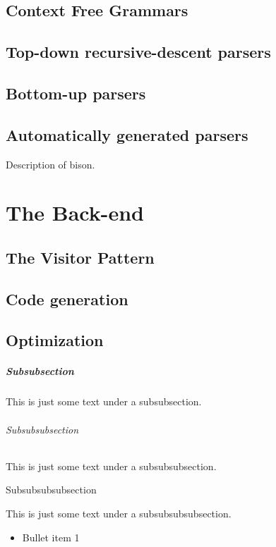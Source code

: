 \documentclass[letterpaper,12pt,openany,reqno]{book}%
\begin{document}
\begin{emumerate}
\chapter{Context Free Grammars}
\chapter {Top-down recursive-descent parsers}
\chapter {Bottom-up parsers}
\chapter {Automatically generated parsers}
Description of bison.

\part{The Back-end}
\chapter {The Visitor Pattern}
\chapter {Code generation}
\chapter {Optimization}

\subsubsection{Subsubsection}

This is just some text under a subsubsection.

\paragraph{Subsubsubsection}

This is just some  text under a subsubsubsection.

\subparagraph{Subsubsubsubsection}

This is just some text under a subsubsubsubsection.


\begin{itemize}
\item Bullet item 1


\end{itemize}
\end{emumerate}
\end{document}
